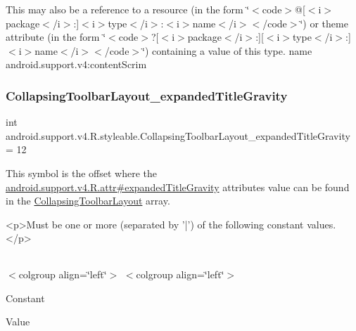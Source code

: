 This may also be a reference to a resource (in the form \char`\"{}$<$code$>$@\mbox{[}$<$i$>$package$<$/i$>$\+:\mbox{]}$<$i$>$type$<$/i$>$\+:$<$i$>$name$<$/i$>$$<$/code$>$\char`\"{}) or theme attribute (in the form \char`\"{}$<$code$>$?\mbox{[}$<$i$>$package$<$/i$>$\+:\mbox{]}\mbox{[}$<$i$>$type$<$/i$>$\+:\mbox{]}$<$i$>$name$<$/i$>$$<$/code$>$\char`\"{}) containing a value of this type.  name android.\+support.\+v4\+:content\+Scrim \mbox{\label{classandroid_1_1support_1_1v4_1_1R_1_1styleable_aa59a6ab621e7092c65425b2e443edc19}} 
\subsubsection{\texorpdfstring{Collapsing\+Toolbar\+Layout\+\_\+expanded\+Title\+Gravity}{CollapsingToolbarLayout\_expandedTitleGravity}}
{\footnotesize\ttfamily int android.\+support.\+v4.\+R.\+styleable.\+Collapsing\+Toolbar\+Layout\+\_\+expanded\+Title\+Gravity = 12\hspace{0.3cm}{\ttfamily [static]}}

This symbol is the offset where the \hyperlink{classandroid_1_1support_1_1v4_1_1R_1_1attr_ae9bc589f12bff8017da7402e0b008111}{android.\+support.\+v4.\+R.\+attr\#expanded\+Title\+Gravity} attribute\textquotesingle{}s value can be found in the \hyperlink{classandroid_1_1support_1_1v4_1_1R_1_1styleable_a91b20e27088c910353d38c1efde32aa9}{Collapsing\+Toolbar\+Layout} array.

\begin{DoxyVerb}      <p>Must be one or more (separated by '|') of the following constant values.</p>
\end{DoxyVerb}
 \tabulinesep=1mm
\begin{longtabu} spread 0pt [c]{*{0}{|X[-1]}|}
\hline
\end{longtabu}
$<$colgroup align=\char`\"{}left\char`\"{}$>$ $<$colgroup align=\char`\"{}left\char`\"{}$>$ 

Constant

Value

